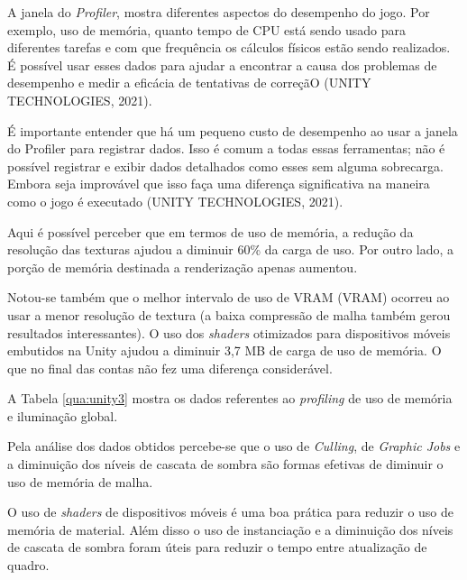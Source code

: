 A janela do \textit{Profiler}, mostra diferentes aspectos do desempenho do jogo. Por exemplo, uso de memória, quanto tempo de CPU está sendo usado para diferentes tarefas e com que frequência os cálculos físicos estão sendo realizados. É possível usar esses dados para ajudar a encontrar a causa dos problemas de desempenho e medir a eficácia de tentativas de correçãO (UNITY TECHNOLOGIES, 2021).

É importante entender que há um pequeno custo de desempenho ao usar a janela do Profiler para registrar dados. Isso é comum a todas essas ferramentas; não é possível registrar e exibir dados detalhados como esses sem alguma sobrecarga. Embora seja improvável que isso faça uma diferença significativa na maneira como o jogo é executado (UNITY TECHNOLOGIES, 2021).



Aqui é possível perceber que em termos de uso de memória, a redução da resolução das texturas ajudou a diminuir 60\% da carga de uso. Por outro lado, a porção de memória destinada a renderização apenas aumentou.

Notou-se também que o melhor intervalo de uso de VRAM (\acrlong{VRAM}) ocorreu ao usar a menor resolução de textura (a baixa compressão de malha também gerou resultados interessantes). O uso dos \textit{shaders} otimizados para dispositivos móveis embutidos na Unity ajudou a diminuir 3,7 MB de carga de uso de memória. O que no final das contas não fez uma diferença considerável.

A Tabela \ref{qua:unity3} mostra os dados referentes ao \textit{profiling} de uso de memória e iluminação global.



Pela análise dos dados obtidos percebe-se que o uso de \textit{Culling}, de \textit{Graphic Jobs} e a diminuição dos níveis de cascata de sombra são formas efetivas de diminuir o uso de memória de malha.

O uso de \textit{shaders} de dispositivos móveis é uma boa prática para reduzir o uso de memória de material. Além disso o uso de instanciação e a diminuição dos níveis de cascata de sombra foram úteis para reduzir o tempo entre atualização de quadro.
